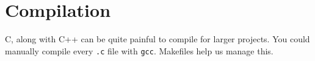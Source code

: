 \section{Compilation}\label{sec:Compilation}
C, along with C++ can be quite painful to compile for larger projects.
You could manually compile every \texttt{.c} file with \texttt{gcc}.
Makefiles help us manage this.


